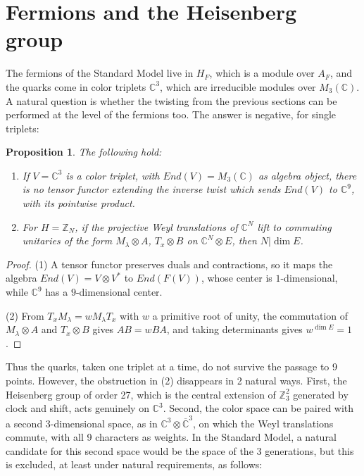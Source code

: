 \documentclass[11pt]{amsart}
\newtheorem{proposition}[theorem]{Proposition}
\theoremstyle{definition}
\begin{document}
\section{Fermions and the Heisenberg group}

The fermions of the Standard Model live in $H_F$, which is a module over $A_F$, and the quarks come in color triplets $\mathbb C^3$, which are irreducible modules over $M_3(\mathbb C)$. A natural question is whether the twisting from the previous sections can be performed at the level of the fermions too. The answer is negative, for single triplets:

\begin{proposition}
The following hold:
\begin{enumerate}
\item If $V=\mathbb C^3$ is a color triplet, with $End(V)=M_3(\mathbb C)$ as algebra object, there is no tensor functor extending the inverse twist which sends $End(V)$ to $\mathbb C^9$, with its pointwise product.

\item For $H=\mathbb Z_N$, if the projective Weyl translations of $\mathbb C^N$ lift to commuting unitaries of the form $M_\lambda\otimes A$, $T_x\otimes B$ on $\mathbb C^N\otimes E$, then $N|\dim E$.
\end{enumerate}
\end{proposition}

\begin{proof}
(1) A tensor functor preserves duals and contractions, so it maps the algebra $End(V)=V\otimes V^*$ to $End(F(V))$, whose center is $1$-dimensional, while $\mathbb C^9$ has a $9$-dimensional center.

(2) From $T_xM_\lambda=wM_\lambda T_x$ with $w$ a primitive root of unity, the commutation of $M_\lambda\otimes A$ and $T_x\otimes B$ gives $AB=wBA$, and taking determinants gives $w^{\dim E}=1$.
\end{proof}

Thus the quarks, taken one triplet at a time, do not survive the passage to 9 points. However, the obstruction in (2) disappears in 2 natural ways. First, the Heisenberg group of order 27, which is the central extension of $\mathbb Z_3^2$ generated by clock and shift, acts genuinely on $\mathbb C^3$. Second, the color space can be paired with a second 3-dimensional space, as in $\mathbb C^3\otimes\overline{\mathbb C}^3$, on which the Weyl translations commute, with all 9 characters as weights. In the Standard Model, a natural candidate for this second space would be the space of the 3 generations, but this is excluded, at least under natural requirements, as follows:
\end{document}
